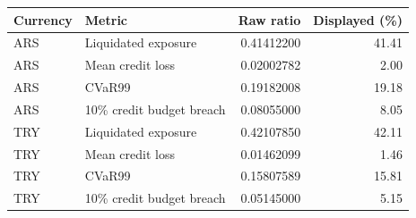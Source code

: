 \begin{tabular}{llrr}
\toprule
Currency & Metric & Raw ratio & Displayed (\%) \\
\midrule
ARS & Liquidated exposure & 0.41412200 & 41.41 \\
ARS & Mean credit loss & 0.02002782 & 2.00 \\
ARS & CVaR99 & 0.19182008 & 19.18 \\
ARS & 10\% credit budget breach & 0.08055000 & 8.05 \\
TRY & Liquidated exposure & 0.42107850 & 42.11 \\
TRY & Mean credit loss & 0.01462099 & 1.46 \\
TRY & CVaR99 & 0.15807589 & 15.81 \\
TRY & 10\% credit budget breach & 0.05145000 & 5.15 \\
\bottomrule
\end{tabular}
